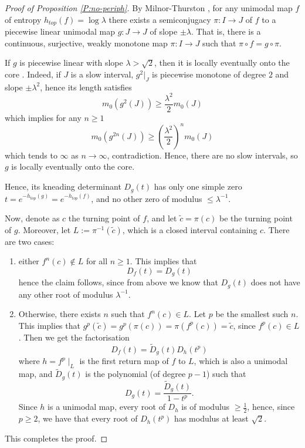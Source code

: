 \documentclass[11pt]{amsart}
\begin{document}
\begin{proof}[Proof of Proposition \ref{P:no-periph}]
By Milnor-Thurston \cite{MT}, for any unimodal map $f$ of entropy $h_{top}(f) = \log \lambda$ there exists a semiconjugacy $\pi : I \to J$ of $f$ to a piecewise linear unimodal map $g : J \to J$ of slope $\pm \lambda$. That is, there is a continuous, surjective, weakly monotone map $\pi : I \to J$ such that $\pi \circ f = g \circ \pi$.

If $g$ is piecewise linear with slope $\lambda > \sqrt{2}$, then it is locally eventually onto the core \cite[Theorem 2]{Bo}. 
Indeed, if $J$ is a slow interval, $g^2\vert_{J}$ is piecewise monotone of degree $2$ and slope $\pm \lambda^2$, hence its length satisfies
$$m_0(g^{2}(J)) \geq \frac{\lambda^2}{2} m_0(J)$$
which implies for any $n \geq 1$
$$m_0(g^{2n}(J)) \geq \left(\frac{\lambda^2}{2}\right)^n m_0(J)$$
which tends to $\infty$ as $n \to \infty$, contradiction. Hence, there are no slow intervals, 
so $g$ is locally eventually onto the core.

Hence, its kneading 
determinant $D_g(t)$ 
has only one simple zero $t = e^{-h_{top}(g)} = e^{-h_{top}(f)}$, and no other zero of modulus $\leq \lambda^{-1}$.

Now, denote as $c$ the turning point of $f$, and let $\widetilde{c} = \pi(c)$ be the turning point of $g$. Moreover, let $L := \pi^{-1}(\widetilde{c})$, which is a closed interval containing $c$. There are two cases: 
\begin{enumerate}
\item
either $f^n(c) \notin L$ for all $n \geq 1$. This implies that 
$$D_f(t) = D_g(t)$$
hence the claim follows, since from above we know that $D_g(t)$ does not have any other root of modulus $\lambda^{-1}$.
\item 
Otherwise, there exists $n$ such that $f^n(c) \in L$. Let $p$ be the smallest such $n$. This implies that $g^p(\widetilde{c}) = g^p(\pi(c)) = \pi(f^p(c)) = \widetilde{c}$, since $f^p(c) \in L$. Then we get the factorisation
$$D_f(t) = \widetilde{D}_g(t) D_h(t^p)$$
where $h = f^p\mid_L$ is the first return map of $f$ to $L$, which is also a unimodal map, and $\widetilde{D}_g(t)$ is the polynomial (of degree $p-1$)
such that 
$$D_g(t) = \frac{\widetilde{D}_g(t)}{1-t^p}.$$
Since $h$ is a unimodal map, every root of $D_h$ is of modulus $\geq \frac{1}{2}$, hence, since $p \geq 2$, we have 
that every root of $D_h(t^p)$ has modulus at least $\sqrt{2}$. 
\end{enumerate}
This completes the proof. 
\end{proof}
\end{document}
